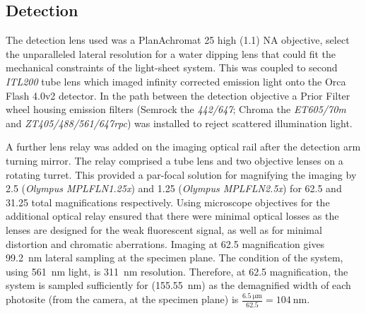\subsection{Detection}

The detection lens used was a PlanAchromat \SI{25}{\times} high (\SI{1.1}{}) \gls{NA} objective, select the unparalleled lateral resolution for a water dipping lens that could fit the mechanical constraints of the \gls{light-sheet} system.
This was coupled to second \emph{ITL200} tube lens which imaged infinity corrected emission light onto the Orca Flash 4.0v2 detector.
In the path between the detection objective a Prior Filter wheel housing emission filters (Semrock the \emph{442/647};
Chroma the \emph{ET605/70m} and \emph{ZT405/488/561/647rpc}) was installed to reject scattered illumination light.

A further lens relay was added on the \gls{imaging optical rail} after the \gls{detection arm} turning mirror.
The relay comprised a tube lens and two objective lenses on a rotating turret.
This provided a par-focal solution for magnifying the imaging by \SI{2.5}{\times} (\emph{Olympus MPLFLN1.25x}) and \SI{1.25}{\times} (\emph{Olympus MPLFLN2.5x}) for \SI{62.5}{\times} and \SI{31.25}{\times} total magnifications respectively.
Using microscope objectives for the additional optical relay ensured that there were minimal optical losses as the lenses are designed for the weak fluorescent signal, as well as for minimal distortion and chromatic aberrations.
Imaging at \SI{62.5}{\times} magnification gives \SI{99.2}{\nano\meter} lateral sampling at the specimen plane.
The  condition of the system, using \SI{561}{\nano\meter} light, is \SI{311}{\nano\meter} resolution.
Therefore, at \SI{62.5}{\times} magnification, the system is sampled sufficiently for  (\SI{155.55}{\nano\meter})
as the demagnified width of each \gls{photosite} (from the camera, at the specimen plane) is \(\frac{\SI{6.5}{\micro\meter}}{62.5}=\SI{104}{\nano\meter}\).

